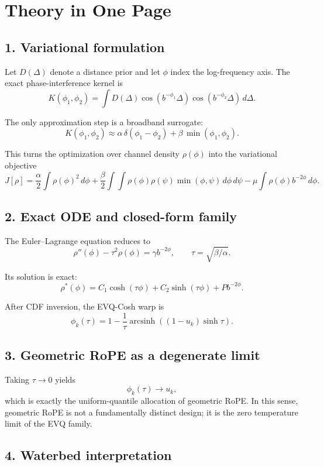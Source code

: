 \documentclass[11pt]{article}
\begin{document}
\section*{Theory in One Page}

\subsection*{1. Variational formulation}

Let $D(\Delta)$ denote a distance prior and let $\phi$ index the log-frequency
axis. The exact phase-interference kernel is
\[
K(\phi_1,\phi_2)
= \int D(\Delta)\cos(b^{-\phi_1}\Delta)\cos(b^{-\phi_2}\Delta)\,d\Delta.
\]

The only approximation step is a broadband surrogate:
\[
K(\phi_1,\phi_2) \approx \alpha\,\delta(\phi_1-\phi_2)+\beta\,\min(\phi_1,\phi_2).
\]

This turns the optimization over channel density $\rho(\phi)$ into the
variational objective
\[
J[\rho]
= \frac{\alpha}{2}\int \rho(\phi)^2\,d\phi
+ \frac{\beta}{2}\int\!\!\int \rho(\phi)\rho(\psi)\min(\phi,\psi)\,d\phi\,d\psi
- \mu\int \rho(\phi)b^{-2\phi}\,d\phi.
\]

\subsection*{2. Exact ODE and closed-form family}

The Euler--Lagrange equation reduces to
\[
\rho''(\phi)-\tau^2\rho(\phi)=\gamma b^{-2\phi},
\qquad \tau=\sqrt{\beta/\alpha}.
\]

Its solution is exact:
\[
\rho^*(\phi)=C_1\cosh(\tau\phi)+C_2\sinh(\tau\phi)+Pb^{-2\phi}.
\]

After CDF inversion, the EVQ-Cosh warp is
\[
\phi_k(\tau)
= 1-\frac{1}{\tau}\operatorname{arcsinh}\!\left((1-u_k)\sinh\tau\right).
\]

\subsection*{3. Geometric RoPE as a degenerate limit}

Taking $\tau\to 0$ yields
\[
\phi_k(\tau)\to u_k,
\]
which is exactly the uniform-quantile allocation of geometric RoPE. In this
sense, geometric RoPE is not a fundamentally distinct design; it is the zero
temperature limit of the EVQ family.

\subsection*{4. Waterbed interpretation}
\end{document}
